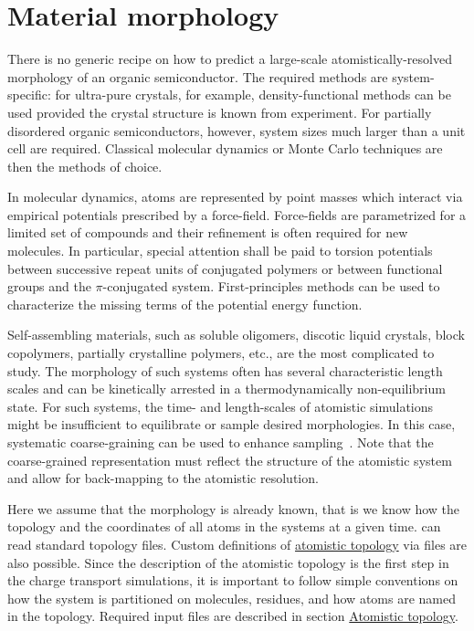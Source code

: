 \section{Material morphology}
\label{sec:morphology}

There is no generic recipe on how to predict a large-scale atomistically-resolved morphology of an organic semiconductor. The required methods are system-specific: for ultra-pure crystals, for example, density-functional methods can be used provided the crystal structure is known from experiment. For partially disordered organic semiconductors, however, system sizes much larger than a unit cell  are required. Classical molecular dynamics or Monte Carlo techniques are then the methods of choice. 

In molecular dynamics, atoms are represented by point masses which interact via empirical potentials prescribed by a force-field. Force-fields are parametrized for a limited set of compounds and their refinement is often required for new molecules. In particular, special attention shall be paid to torsion potentials between successive repeat units of conjugated polymers or between functional groups and the $\pi$-conjugated system. First-principles methods can be used to characterize the missing terms of the potential energy function. 

Self-assembling materials, such as soluble oligomers, discotic liquid crystals, block copolymers, partially crystalline polymers, etc., are the most complicated to study. The morphology of such systems often has several characteristic length scales and can be kinetically arrested in a thermodynamically non-equilibrium state. For such systems, the time- and length-scales of atomistic simulations might be insufficient to equilibrate or sample desired morphologies. In this case, systematic coarse-graining can be used to enhance sampling~\cite{ruehle_versatile_2009}. Note that the coarse-grained representation must reflect the structure of the atomistic system and allow for back-mapping to the atomistic resolution.

Here we assume that the morphology is already known, that is we know how the topology and the coordinates of all atoms in the systems at a given time. \votcactp can read standard \gromacs topology files. Custom definitions of \hyperref[sec:atomistic]{atomistic topology} via \xml files are also possible. Since the description of the atomistic topology is the first step in the charge transport simulations, it is important to follow simple conventions on how the system is partitioned on molecules, residues, and how atoms are named in the topology. Required input files are described in section \hyperref[sec:atomistic]{Atomistic topology}. 
